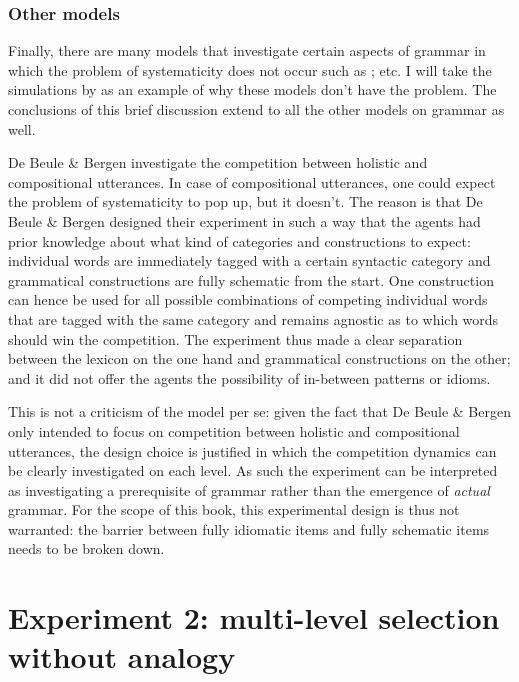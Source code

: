 \subsubsection{Other models}
 Finally, there are many models that investigate certain aspects of grammar in which the problem of systematicity does not occur such as \citet{debeule07compositionality, debeule06emergence, nowak99evolution, steels06how-grammar}; etc. I will take the simulations by \citet{debeule06emergence} as an example of why these models don't have the problem. The conclusions of this brief discussion extend to all the other models on grammar as well.

De Beule \& Bergen investigate the competition between holistic and compositional utterances. In case of compositional utterances, one could expect the problem of systematicity to pop up, but it doesn't. The reason is that De Beule \& Bergen designed their experiment in such a way that the agents had prior knowledge about what kind of categories and constructions to expect: individual words are immediately tagged with a certain syntactic category and grammatical constructions are fully schematic from the start. One construction can hence be used for all possible combinations of competing individual words that are tagged with the same category and remains agnostic as to which words should win the competition. The experiment thus made a clear separation between the lexicon on the one hand and grammatical constructions on the other; and it did not offer the agents the possibility of in-between patterns or idioms.

This is not a criticism of the model per se: given the fact that De Beule \& Bergen only intended to focus on competition between holistic and compositional utterances, the design choice is justified in which the competition dynamics can be clearly investigated on each level. As such the experiment can be interpreted as investigating a prerequisite of grammar rather than the emergence of {\em actual} grammar. For the scope of this book, this experimental design is thus not warranted: the barrier between fully idiomatic items and fully schematic items needs to be broken down.

\section{Experiment 2: multi-level selection without analogy}
\label{s:pattern-exp-2}

